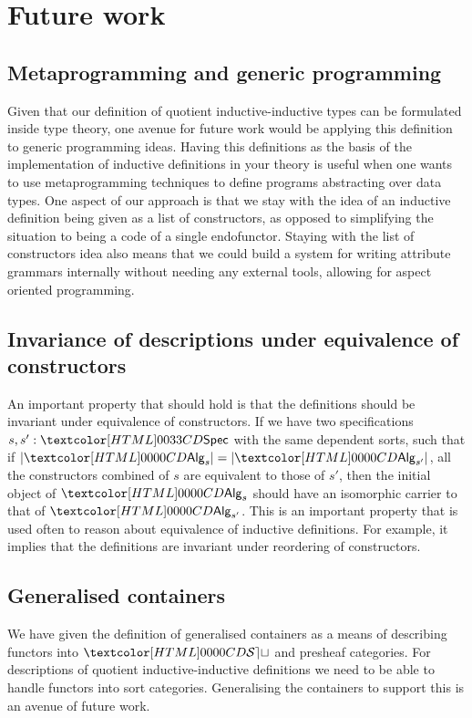 \section{Future work}

\subsection{Metaprogramming and generic programming}

Given that our definition of quotient inductive-inductive types can be
formulated inside type theory, one avenue for future work would be
applying this definition to generic programming ideas. Having this
definitions as the basis of the implementation of inductive
definitions in your theory is useful when one wants to use
metaprogramming techniques to define programs abstracting over data
types. One aspect of our approach is that we stay with the idea of an
inductive definition being given as a list of constructors, as opposed
to simplifying the situation to being a code of a single
endofunctor. Staying with the list of constructors idea also means
that we could build a system for writing attribute grammars internally
without needing any external tools, allowing for aspect oriented
programming.

\subsection{Invariance of descriptions under equivalence of constructors}

An important property that should hold is that the definitions should
be invariant under equivalence of constructors. If we have two
specifications $s, s' : \specty$ with the same dependent sorts, such
that if $| \Alg_s | = | \Alg_{s'} |$, \ie all the constructors
combined of $s$ are equivalent to those of $s'$, then the initial
object of $\Alg_s$ should have an isomorphic carrier to that of
$\Alg_{s'}$. This is an important property that is used often to
reason about equivalence of inductive definitions. For example, it
implies that the definitions are invariant under reordering of
constructors.

\subsection{Generalised containers}

We have given the definition of generalised containers as a means of
describing functors into $\SET$ and presheaf categories. For
descriptions of quotient inductive-inductive definitions we need to be
able to handle functors into sort categories. Generalising the
containers to support this is an avenue of future work.

